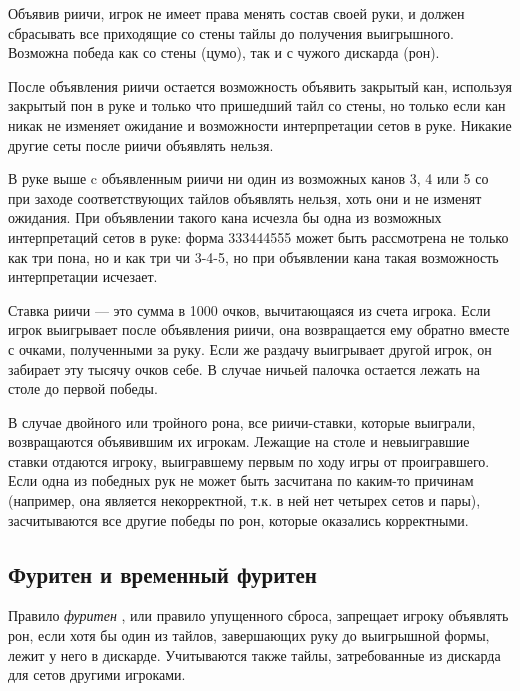 Объявив риичи, игрок не имеет права менять состав своей руки, и должен сбрасывать все приходящие со стены тайлы до получения выигрышного. Возможна победа как со стены (цумо), так и с чужого дискарда (рон).

После объявления риичи остается возможность объявить закрытый кан, используя закрытый пон в руке и только что пришедший тайл со стены, но только если кан никак не изменяет ожидание и возможности интерпретации сетов в руке. Никакие другие сеты после риичи объявлять нельзя.

\begin{example}

	\vspace{5mm}

	В руке выше c объявленным риичи ни один из возможных канов 3, 4 или 5 со при заходе соответствующих тайлов объявлять нельзя, хоть они и не изменят ожидания. При объявлении такого кана исчезла бы одна из возможных интерпретаций сетов в руке: форма 333444555 может быть рассмотрена не только как три пона, но и как три чи 3-4-5, но при объявлении кана такая возможность интерпретации исчезает.

\end{example}

Ставка риичи --- это сумма в 1000 очков, вычитающаяся из счета игрока. Если игрок выигрывает после объявления риичи, она возвращается ему обратно вместе с очками, полученными за руку. Если же раздачу выигрывает другой игрок, он забирает эту тысячу очков себе. В случае ничьей палочка остается лежать на столе до первой победы.

В случае двойного или тройного рона, все риичи-ставки, которые выиграли, возвращаются объявившим их игрокам. Лежащие на столе и невыигравшие ставки отдаются игроку, выигравшему первым по ходу игры от проигравшего. Если одна из победных рук не может быть засчитана по каким-то причинам (например, она является некорректной, т.к. в ней нет четырех сетов и пары), засчитываются все другие победы по рон, которые оказались корректными.

\subsection{Фуритен и временный фуритен}

Правило \textit{фуритен} , или правило упущенного сброса, запрещает игроку объявлять рон, если хотя бы один из тайлов, завершающих руку до выигрышной формы, лежит у него в дискарде. Учитываются также тайлы, затребованные из дискарда для сетов другими игроками.

